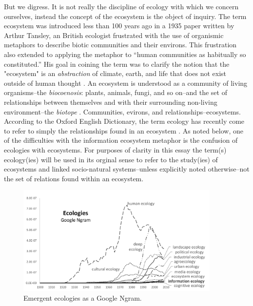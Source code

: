 But we digress. It is not really the discipline of ecology with which we concern ourselves, instead the concept of the ecosystem is the object of inquiry. The term ecosystem was introduced less than 100 years ago in a 1935 paper written by Arthur Tansley, an British ecologist frustrated with the use of organismic metaphors to describe biotic communities and their environs. This frustration also extended to applying the metaphor to “human communities as habitually so constituted.” His goal in coining the term was to clarify the notion that the "ecosystem" is an \textit{abstraction} of climate, earth, and life that does not exist outside of human thought \cite{tansley_1935}. An ecosystem is understood as a community of living organisms--the \textit{biocoenosis}: plants, animals, fungi, and so on--and the set of relationships between themselves and with their surrounding non-living environment--the \textit{biotope} \cite{tansley_1935, odum_1953}. Communities, evirons, and relationships--ecosystems. According to the Oxford English Dictionary, the term ecology has recently come to refer to simply the relationships found in an ecosystem \cite{oed_2008}. As noted below, one of the difficulties with the information ecosystem metaphor is the confusion of ecologies with ecosystems. For purposes of clarity in this essay the term(s) ecology(ies) will be used in its orginal sense to refer to the study(ies) of ecosystems and linked socio-natural systems--unless explicitly noted otherwise--not the set of relations found within an ecosystem. 

\begin{figure}[!ht]
  \centering
    \includegraphics[width=0.9\textwidth]{figures/ecologiesAll}
  \caption{Emergent ecologies as a Google Ngram.}
\end{figure}

